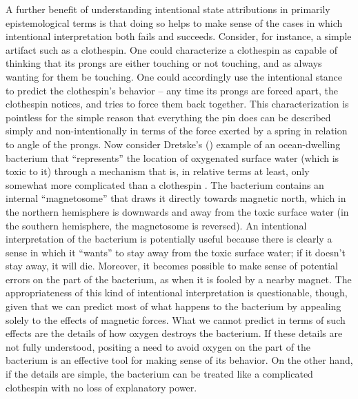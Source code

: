 A further benefit of understanding intentional state attributions in primarily epistemological terms is that doing so helps to make sense of the cases in which intentional interpretation both fails and succeeds. Consider, for instance, a simple artifact such as a clothespin. One could characterize a clothespin as capable of thinking that its prongs are either touching or not touching, and as always wanting for them be touching. One could accordingly use the intentional stance to predict the clothespin's behavior -- any time its prongs are forced apart, the clothespin notices, and tries to force them back together. This characterization is pointless for the simple reason that everything the pin does can be described simply and non-intentionally in terms of the force exerted by a spring in relation to angle of the prongs. Now consider Dretske's (\citeyear{Dretske:1986}) example of an ocean-dwelling bacterium that ``represents'' the location of oxygenated surface water (which is toxic to it) through a mechanism that is, in relative terms at least, only somewhat more complicated than a clothespin \citep[cf.][p. 290-91]{Millikan:1989}. The bacterium contains an internal ``magnetosome'' that draws it directly towards magnetic north, which in the northern hemisphere is downwards and away from the toxic surface water (in the southern hemisphere, the magnetosome is reversed). An intentional interpretation of the bacterium is potentially useful because there is clearly a sense in which it ``wants'' to stay away from the toxic surface water; if it doesn't stay away, it will die. Moreover, it becomes possible to make sense of potential errors on the part of the bacterium, as when it is fooled by a nearby magnet. The appropriateness of this kind of intentional interpretation is questionable, though, given that we can predict most of what happens to the bacterium by appealing solely to the effects of magnetic forces. What we cannot predict in terms of such effects are the details of how oxygen destroys the bacterium. If these details are not fully understood, positing a need to avoid oxygen on the part of the bacterium is an effective tool for making sense of its behavior. On the other hand, if the details are simple, the bacterium can be treated like a complicated clothespin with no loss of explanatory power. 

